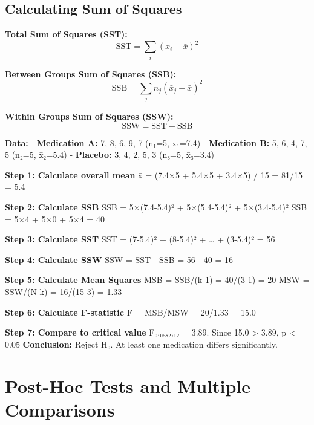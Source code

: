 \documentclass[
  11pt,
  letterpaper,
  oneside]{book}
\begin{document}
\subsection{Calculating Sum of
Squares}\label{calculating-sum-of-squares}

\textbf{Total Sum of Squares (SST):}
\[\text{SST} = \sum_i(x_i - \bar{x})^2\]

\textbf{Between Groups Sum of Squares (SSB):}
\[\text{SSB} = \sum_j n_j(\bar{x}_j - \bar{x})^2\]

\textbf{Within Groups Sum of Squares (SSW):}
\[\text{SSW} = \text{SST} - \text{SSB}\]

\begin{tcolorbox}[enhanced jigsaw, toprule=.15mm, left=2mm, opacitybacktitle=0.6, colframe=quarto-callout-tip-color-frame, leftrule=.75mm, titlerule=0mm, coltitle=black, colbacktitle=quarto-callout-tip-color!10!white, toptitle=1mm, title=\textcolor{quarto-callout-tip-color}{\faLightbulb}\hspace{0.5em}{Worked Example: Pain Medication Study}, bottomtitle=1mm, arc=.35mm, rightrule=.15mm, bottomrule=.15mm, breakable, opacityback=0, colback=white]

\textbf{Data:} - \textbf{Medication A:} 7, 8, 6, 9, 7 (n₁=5, x̄₁=7.4) -
\textbf{Medication B:} 5, 6, 4, 7, 5 (n₂=5, x̄₂=5.4) - \textbf{Placebo:}
3, 4, 2, 5, 3 (n₃=5, x̄₃=3.4)

\textbf{Step 1: Calculate overall mean} x̄ = (7.4×5 + 5.4×5 + 3.4×5) / 15
= 81/15 = 5.4

\textbf{Step 2: Calculate SSB} SSB = 5×(7.4-5.4)² + 5×(5.4-5.4)² +
5×(3.4-5.4)² SSB = 5×4 + 5×0 + 5×4 = 40

\textbf{Step 3: Calculate SST} SST = (7-5.4)² + (8-5.4)² + \ldots{} +
(3-5.4)² = 56

\textbf{Step 4: Calculate SSW} SSW = SST - SSB = 56 - 40 = 16

\textbf{Step 5: Calculate Mean Squares} MSB = SSB/(k-1) = 40/(3-1) = 20
MSW = SSW/(N-k) = 16/(15-3) = 1.33

\textbf{Step 6: Calculate F-statistic} F = MSB/MSW = 20/1.33 = 15.0

\textbf{Step 7: Compare to critical value} F₀.₀₅,₂,₁₂ = 3.89. Since 15.0
\textgreater{} 3.89, p \textless{} 0.05 \textbf{Conclusion:} Reject H₀.
At least one medication differs significantly.

\end{tcolorbox}

\section{Post-Hoc Tests and Multiple
Comparisons}\label{post-hoc-tests-and-multiple-comparisons}
\end{document}
